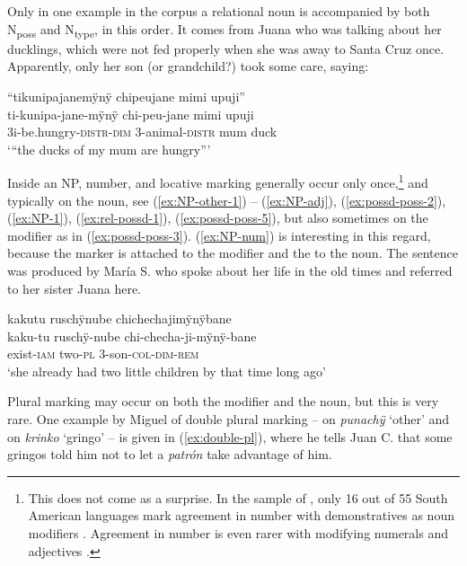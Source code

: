 Only in one example in the corpus a relational noun is accompanied by both N\textsubscript{poss} and N\textsubscript{type}, in this order. It comes from Juana who was talking about her ducklings, which were not fed properly when she was away to Santa Cruz once. Apparently, only her son (or grandchild?) took some care, saying: 

\ea\label{ex:possd-poss-5}
\begingl
\glpreamble “tikunipajanemÿnÿ chipeujane mimi upuji”\\
\gla ti-kunipa-jane-mÿnÿ chi-peu-jane mimi upuji\\
\glb 3i-be.hungry-\textsc{distr}-\textsc{dim} 3-animal-\textsc{distr} mum duck\\
\glft ‘“the ducks of my mum are hungry”’
\endgl
{}
\xe
{}

Inside an NP, number,  and locative marking generally occur only once,\footnote{This does not come as a surprise. In the sample of \citet[]{Krasnoukhova2012}, only 16 out of 55 South American languages mark agreement in number with demonstratives as noun modifiers \citep[52]{Krasnoukhova2012}. Agreement in number is even rarer with modifying numerals and adjectives \citep[126, 163–164]{Krasnoukhova2012}.} and typically on the  noun, see (\ref{ex:NP-other-1}) – (\ref{ex:NP-adj}), (\ref{ex:possd-poss-2}), (\ref{ex:NP-1}), (\ref{ex:rel-possd-1}), (\ref{ex:possd-poss-5}), but also sometimes on the modifier as in (\ref{ex:possd-poss-3}). (\ref{ex:NP-num}) is interesting in this regard, because the  marker is attached to the modifier and the  to the  noun. The sentence was produced by María S. who spoke about her life in the old times and referred to her sister Juana here.

\ea\label{ex:NP-num}
\begingl
\glpreamble kakutu ruschÿnube chichechajimÿnÿbane\\
\gla kaku-tu ruschÿ-nube chi-checha-ji-mÿnÿ-bane\\
\glb exist-\textsc{iam} two-\textsc{pl} 3-son-\textsc{col}-\textsc{dim}-\textsc{rem}\\
\glft ‘she already had two little children by that time long ago’
\endgl
\trailingcitation{[rxx-p181101l-2.107]}
\xe

Plural marking may occur on both the modifier and the noun, but this is very rare. One example by Miguel of double plural marking – on \textit{punachÿ} ‘other’ and on \textit{krinko} ‘gringo’ – is given in (\ref{ex:double-pl}), where he tells Juan C. that some gringos told him not to let a \textit{patrón} take advantage of him.


